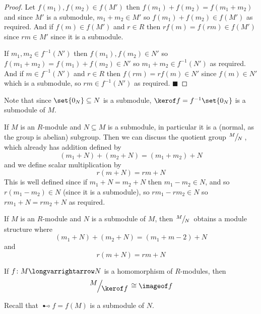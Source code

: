 \documentclass[10pt]{article}
\let\longto=\longvarrightarrow
\def\qed{\hskip1cm\hbox{}\hfill$\blacksquare$}
\begin{document}
\begin{proof}

    \benum
        \item Let $f(m_1),f(m_2)\in f(M')$ then $f(m_1)+f(m_2)=f(m_1+m_2)$ and since $M'$ is a submodule, $m_1+m_2\in M'$ so $f(m_1)+f(m_2)\in f(M')$ as required.
        And if $f(m)\in f(M')$ and $r\in R$ then $rf(m)=f(rm)\in f(M')$ since $rm\in M'$ since it is a submodule.

        \item If $m_1,m_2\in f^{-1}(N')$ then $f(m_1), f(m_2)\in N'$ so $f(m_1+m_2)=f(m_1)+f(m_2)\in N'$ so $m_1+m_2\in f^{-1}(N')$ as required.
        And if $m\in f^{-1}(N')$ and $r\in R$ then $f(rm)=rf(m)\in N'$ since $f(m)\in N'$ which is a submodule, so $rm\in f^{-1}(N')$ as required.
        \qed
    \eenum

\end{proof}

Note that since $\set{0_N}\subseteq N$ is a submodule, $\kerof f=f^{-1}\set{0_N}$ is a submodule of $M$.

If $M$ is an $R$-module and $N\subseteq M$ is a submodule, in particular it is a (normal, as the group is abelian) subgroup.
Then we can discuss the quotient group $\slfrac MN$, which already has addition defined by
\[ (m_1+N) + (m_2+N) = (m_1+m_2) + N \]
and we define scalar multiplication by
\[ r(m+N) = rm + N \]
This is well defined since if $m_1+N=m_2+N$ then $m_1-m_2\in N$, and so $r(m_1-m_2)\in N$ (since it is a submodule), so $rm_1-rm_2\in N$ so $rm_1+N=rm_2+N$ as required.

\begin{defn*}

    If $M$ is an $R$-module and $N$ is a submodule of $M$, then $\slfrac MN$ obtains a module structure where
    \[ (m_1+N) + (m_2+N) = (m_1+m-2) + N \]
    and
    \[ r(m+N) = rm + N \]

\end{defn*}

\begin{thrm*}

    If $f\colon M\longto N$ is a homomorphism of $R$-modules, then
    \[ \slfrac M{\kerof f} \cong \imageof f \]

\end{thrm*}

Recall that $\imageof f=f(M)$ is a submodule of $N$.
\end{document}

